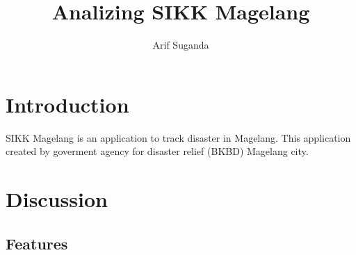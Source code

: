 \documentclass[a4paper,12pt]{article}
\author{Arif Suganda}
\title{Analizing SIKK Magelang}
\begin{document}
\maketitle

\section{Introduction}
SIKK Magelang is an application to track disaster in Magelang. 
This application created by goverment agency for disaster relief (BKBD) Magelang city.

\section{Discussion}

\subsection{Features}
\end{document}
